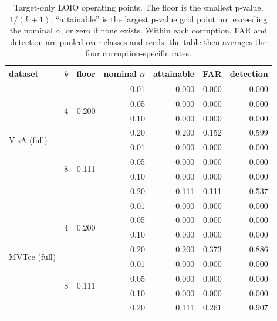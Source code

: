 \begin{table}[pos=t]
\centering
\caption{Target-only LOIO operating points. The floor is the smallest p-value, $1/(k{+}1)$; ``attainable'' is the largest p-value grid point not exceeding the nominal $\alpha$, or zero if none exists. Within each corruption, FAR and detection are pooled over classes and seeds; the table then averages the four corruption-specific rates.}
\label{tab:attainable-alpha}
\footnotesize
\setlength{\tabcolsep}{3pt}
\begin{tabular}{llrrrrr}
\toprule
dataset & $k$ & floor & nominal $\alpha$ & attainable & FAR & detection \\
\midrule
\multirow{8}{*}{VisA (full)} & \multirow{4}{*}{4} & \multirow{4}{*}{0.200} & 0.01 & 0.000 & 0.000 & 0.000 \\
 & & & 0.05 & 0.000 & 0.000 & 0.000 \\
 & & & 0.10 & 0.000 & 0.000 & 0.000 \\
 & & & 0.20 & 0.200 & 0.152 & 0.599 \\
\cmidrule(lr){2-7}
 & \multirow{4}{*}{8} & \multirow{4}{*}{0.111} & 0.01 & 0.000 & 0.000 & 0.000 \\
 & & & 0.05 & 0.000 & 0.000 & 0.000 \\
 & & & 0.10 & 0.000 & 0.000 & 0.000 \\
 & & & 0.20 & 0.111 & 0.111 & 0.537 \\
\midrule
\multirow{8}{*}{MVTec (full)} & \multirow{4}{*}{4} & \multirow{4}{*}{0.200} & 0.01 & 0.000 & 0.000 & 0.000 \\
 & & & 0.05 & 0.000 & 0.000 & 0.000 \\
 & & & 0.10 & 0.000 & 0.000 & 0.000 \\
 & & & 0.20 & 0.200 & 0.373 & 0.886 \\
\cmidrule(lr){2-7}
 & \multirow{4}{*}{8} & \multirow{4}{*}{0.111} & 0.01 & 0.000 & 0.000 & 0.000 \\
 & & & 0.05 & 0.000 & 0.000 & 0.000 \\
 & & & 0.10 & 0.000 & 0.000 & 0.000 \\
 & & & 0.20 & 0.111 & 0.261 & 0.907 \\
\bottomrule
\end{tabular}
\end{table}
